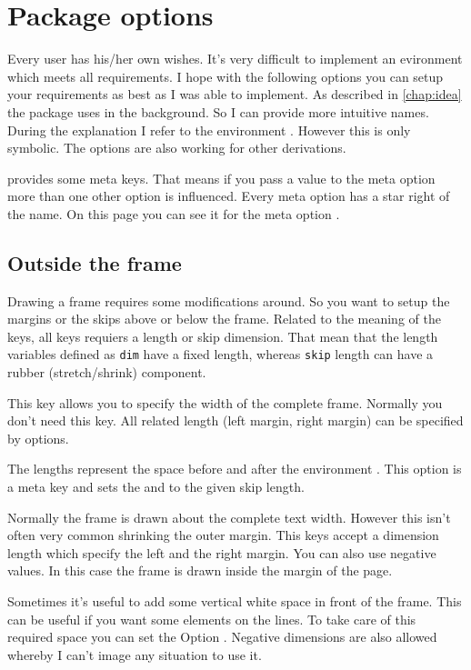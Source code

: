 \documentclass[openany,12pt,tocdepth=3]{ltx-md}
\begin{document}
\chapter{Package options}\label{chap:options}
Every user has his/her own wishes. It's very difficult to implement an evironment 
which meets all requirements. I hope with the following options you can setup your 
requirements as best as I was able to implement. As described in \autoref{chap:idea}
the package uses  in the background. So I can provide more intuitive names.
During the explanation I refer to the environment . However this is only
symbolic. The options are also working for other derivations. 

 provides some meta keys. That means if you pass a value
to the meta option more than one other option is influenced. Every meta
option has a star right of the name. On this page you can see it for the
meta option .


\section{Outside the frame}
Drawing a frame requires some modifications around. So you want to setup the margins
or the skips above or below the frame. Related to the meaning of the keys, all keys 
requiers a length or skip dimension. That mean that the length variables defined as
\texttt{dim} have a fixed length, whereas \texttt{skip} length can have a rubber (stretch/shrink) component. 

\ExplOpt[\string\linewidth]{width}
This key allows you to specify the width of the complete frame. 
Normally you don't need this key. All related length (left margin, right margin)
can be specified by options. 


The lengths represent the space before and after the environment .  
This option  is a meta key and sets the  and  to the given skip length. 


Normally the frame  is drawn about the complete text width. However this isn't
often very common shrinking the outer margin. This keys accept a dimension length 
which specify the left and the right margin. You can also use negative values. In this case the frame 
is drawn inside the margin of the page.


Sometimes it's useful to add some vertical white space in front of the frame. This can be useful
if you want some elements on the lines. To take care of this required space you can
set the Option . Negative dimensions are also allowed whereby I can't
image any situation to use it. 
\end{document}
